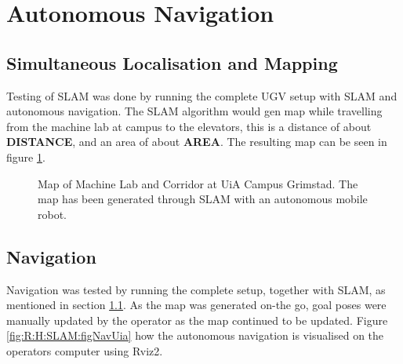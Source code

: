 \section{Autonomous Navigation} \label{sec:R:AutonomousNavigaion}

\subsection{Simultaneous Localisation and Mapping}\label{sec:R:AN:SLAM}
Testing of SLAM was done by running the complete UGV setup with SLAM and autonomous navigation. The SLAM algorithm would gen  map while travelling from the machine lab at campus to the elevators, this is a distance of about \textbf{DISTANCE}, and an area of about \textbf{AREA}. The resulting map can be seen in figure \ref{fig:R:AN:SLAM:figUiaMap}.

\begin{figure}[H]
  \centering
  
  \caption{Map of Machine Lab and Corridor at UiA Campus Grimstad. The map has been generated through SLAM with an autonomous mobile robot.}
  \label{fig:R:AN:SLAM:figUiaMap}
\end{figure}

\subsection{Navigation}\label{sec:R:AN:Navigation}
Navigation was tested by running the complete setup, together with SLAM, as mentioned in section \ref{sec:R:AN:SLAM}. As the map was generated on-the go, goal poses were manually updated by the operator as the map continued to be updated. Figure \ref{fig:R:H:SLAM:figNavUia} how the autonomous navigation is visualised on the operators computer using Rviz2.

